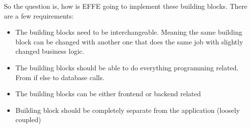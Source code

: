 So the question is, how is EFFE going to implement these building blocks. There are a few requirements:
\begin{itemize}
	\item The building blocks need to be interchangeable. Meaning the same building block can be changed with another one that does the same job with slightly changed business logic.

	\item The building blocks should be able to do everything programming related. From if else to database calls.

	\item The building blocks can be either frontend or backend related

	\item Building block should be completely separate from the application (loosely coupled)
\end{itemize}

